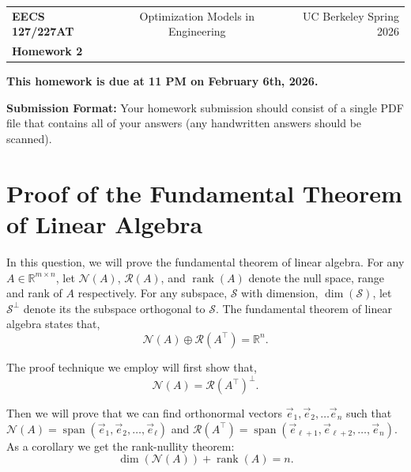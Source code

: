 \documentclass[10pt]{article}
\theoremstyle{definition}
\theoremstyle{plain}
\newcommand{\RR}{\mathbb{R}}
\newcommand{\NN}{\mathcal{N}}
\newcommand{\Range}{\mathcal{R}}
\DeclareMathOperator{\rank}{rank}
\DeclareMathOperator{\spn}{span}
\newcommand{\vv}[1]{\vec{#1}}
\begin{document}
\begin{center}
\begin{tabular}{lcr}
\textbf{EECS 127/227AT} & Optimization Models in Engineering & UC Berkeley \quad Spring 2026 \\
\textbf{Homework 2} & & \\
\end{tabular}
\end{center}

\begin{tcolorbox}
\textbf{This homework is due at 11 PM on February 6th, 2026.}

\textbf{Submission Format:} Your homework submission should consist of a single PDF file that contains all of your answers (any handwritten answers should be scanned).
\end{tcolorbox}

\section{Proof of the Fundamental Theorem of Linear Algebra}

In this question, we will prove the fundamental theorem of linear algebra. For any $A \in \RR^{m \times n}$, let $\NN(A)$, $\Range(A)$, and $\rank(A)$ denote the null space, range and rank of $A$ respectively. For any subspace, $\mathcal{S}$ with dimension, $\dim(\mathcal{S})$, let $\mathcal{S}^\perp$ denote its the subspace orthogonal to $\mathcal{S}$. The fundamental theorem of linear algebra states that,
\begin{equation}
\NN(A) \oplus \Range\!\left(A^\top\right) = \RR^n.
\end{equation}

The proof technique we employ will first show that,
\begin{equation}
\NN(A) = \Range\!\left(A^\top\right)^\perp.
\end{equation}

Then we will prove that we can find orthonormal vectors $\vv{e}_1, \vv{e}_2, \ldots \vv{e}_n$ such that $\NN(A) = \spn(\vv{e}_1, \vv{e}_2, \ldots, \vv{e}_\ell)$ and $\Range\!\left(A^\top\right) = \spn(\vv{e}_{\ell+1}, \vv{e}_{\ell+2}, \ldots, \vv{e}_n)$. As a corollary we get the rank-nullity theorem:
\begin{equation}
\dim(\NN(A)) + \rank(A) = n.
\end{equation}
\end{document}
